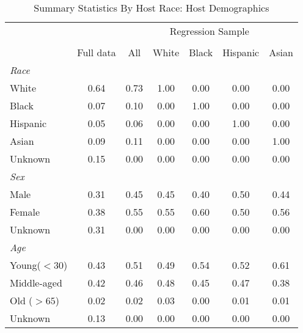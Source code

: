 \begin{table}[htbp]
\caption{Summary Statistics By Host Race: Host Demographics}
\begin{center}%
\small\begin{tabular}{l c | c | c c c c}
& \multicolumn{1}{c}{} & \multicolumn{5}{c}{Regression Sample}
\\
 \cmidrule(r){3-7}
\\
 & \multicolumn{1}{c}{Full data} & \multicolumn{1}{c}{All} & White & Black & Hispanic & Asian
\\
\hline\hline\noalign{\smallskip} 
 \textit{Race} &&&&&& \\
 \hspace{10bp}White & 0.64 & 0.73 &  1.00 & 0.00 &  0.00 & 0.00 \\  \hspace{10bp}Black & 0.07 & 0.10 &  0.00 & 1.00 &  0.00 & 0.00 \\  \hspace{10bp}Hispanic & 0.05 & 0.06 &  0.00 & 0.00 &  1.00 & 0.00 \\  \hspace{10bp}Asian & 0.09 & 0.11 &  0.00 & 0.00 &  0.00 & 1.00 \\  \hspace{10bp}Unknown & 0.15 & {0.00} & {0.00} &  {0.00}  & {0.00}  & {0.00} \\  \textit{Sex} &&&&&& \\
 \hspace{10bp}Male & 0.31 & 0.45 &  0.45 & 0.40 &  0.50 & 0.44 \\  \hspace{10bp}Female & 0.38 & 0.55 &  0.55 & 0.60 &  0.50 & 0.56 \\  \hspace{10bp}Unknown & 0.31 & {0.00} & {0.00} &  {0.00}  & {0.00}  & {0.00} \\  \textit{Age} &&&&&& \\
 \hspace{10bp}Young($<30$) & 0.43 & 0.51 &  0.49 & 0.54 &  0.52 & 0.61 \\  \hspace{10bp}Middle-aged & 0.42 & 0.46 &  0.48 & 0.45 &  0.47 & 0.38 \\  \hspace{10bp}Old ($>65$) & 0.02 & 0.02 &  0.03 & 0.00 &  0.01 & 0.01 \\  \hspace{10bp}Unknown & 0.13 & {0.00} & {0.00} &  {0.00}  & {0.00}  & {0.00} \\ \hline

\end{tabular}
\end{center}
\end{table}
